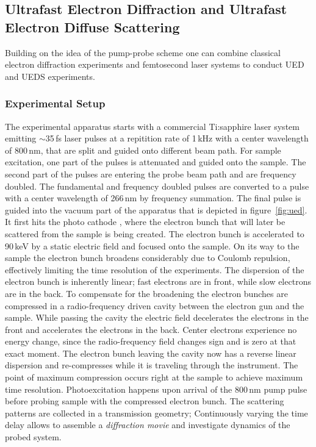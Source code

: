\subsection{Ultrafast Electron Diffraction and Ultrafast Electron Diffuse Scattering}
Building on the idea of the pump-probe scheme one can combine classical electron diffraction experiments and femtosecond laser systems to conduct \ac{UED} and \ac{UEDS} experiments.

\subsubsection*{Experimental Setup}
The experimental apparatus starts with a commercial Ti:sapphire laser system emitting $\sim$35\,fs laser pulses at a repitition rate of 1\,kHz with a center wavelength of 800\,nm, that are split and guided onto different beam path.
For sample excitation, one part of the pulses is attenuated and guided onto the sample.
The second part of the pulses are entering the probe beam path and are frequency doubled. The fundamental and frequency doubled pulses are converted to a pulse with a center wavelength of 266\,nm by frequency summation.
The final pulse is guided into the vacuum part of the apparatus that is depicted in figure~\ref{fig:ued}.
It first hits the photo cathode , where the electron bunch that will later be scattered from the sample is being created.
The electron bunch is accelerated to 90\,keV by a static electric field and focused onto the sample.
On its way to the sample the electron bunch broadens considerably due to Coulomb repulsion, effectively limiting the time resolution of the experiments.
The dispersion of the electron bunch is inherently linear; fast electrons are in front, while slow electrons are in the back.
To compensate for the broadening the electron bunches are compressed in a radio-frequency driven cavity between the electron gun and the sample.
While passing the cavity the electric field decelerates the electrons in the front and accelerates the electrons in the back.
Center electrons experience no energy change, since the radio-frequency field changes sign and is zero at that exact moment.
The electron bunch leaving the cavity now has a reverse linear dispersion and re-compresses while it is traveling through the instrument.
The point of maximum compression occurs right at the sample to achieve maximum time resolution.
Photoexcitation happens upon arrival of the 800\,nm pump pulse before probing sample with the compressed electron bunch.
The scattering patterns are collected in a transmission geometry; Continuously varying the time delay allows to assemble a \emph{diffraction movie} and investigate dynamics of the probed system.

